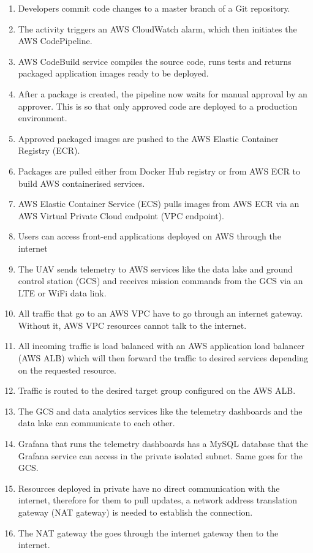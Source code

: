 \begin{enumerate}
    \item Developers commit code changes to a master branch of a Git repository.
    \item The activity triggers an AWS CloudWatch alarm, which then initiates the AWS CodePipeline.
    \item AWS CodeBuild service compiles the source code, runs tests and returns packaged application images ready to be deployed.
    \item After a package is created, the pipeline now waits for manual approval by an approver. This is so that only approved code are deployed to a production environment.
    \item Approved packaged images are pushed to the AWS Elastic Container Registry (ECR).
    \item Packages are pulled either from Docker Hub registry or from AWS ECR to build AWS containerised services.
    \item AWS Elastic Container Service (ECS) pulls images from AWS ECR via an AWS Virtual Private Cloud endpoint (VPC endpoint).
    \item Users can access front-end applications deployed on AWS through the internet
    \item The UAV sends telemetry to AWS services like the data lake and ground control station (GCS) and receives mission commands from the GCS via an LTE or WiFi data link.
    \item All traffic that go to an AWS VPC have to go through an internet gateway. Without it, AWS VPC resources cannot talk to the internet.
    \item All incoming traffic is load balanced with an AWS application load balancer (AWS ALB) which will then forward the traffic to desired services depending on the requested resource.
    \item Traffic is routed to the desired target group configured on the AWS ALB.
    \item The GCS and data analytics services like the telemetry dashboards and the data lake can communicate to each other.
    \item Grafana that runs the telemetry dashboards has a MySQL database that the Grafana service can access in the private isolated subnet. Same goes for the GCS.
    \item Resources deployed in private have no direct communication with the internet, therefore for them to pull updates, a network address translation gateway (NAT gateway) is needed to establish the connection.
    \item The NAT gateway the goes through the internet gateway then to the internet.
\end{enumerate}



